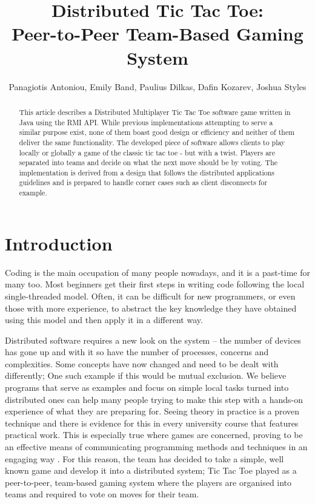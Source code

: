\documentclass[conference]{IEEEtran}
\begin{document}
\title{Distributed Tic Tac Toe:\\ Peer-to-Peer Team-Based Gaming System}

\author{Panagiotis Antoniou, Emily Band, Paulius Dilkas, Dafin Kozarev, Joshua Styles}
\maketitle

\begin{abstract}
This article describes a Distributed Multiplayer Tic Tac Toe software game written in Java using the RMI API. While previous implementations attempting to serve a similar purpose exist, none of them boast good design or efficiency and neither of them deliver the same functionality. The developed piece of software allows clients to play locally or globally a game of the classic tic tac toe - but with a twist. Players are separated into teams and decide on what the next move should be by voting. The implementation is derived from a design that follows the distributed applications guidelines and is prepared to handle corner cases such as client disconnects for example.
\end{abstract}

\section{Introduction}
Coding is the main occupation of many people nowadays, and it is a
past-time for many too. Most beginners get their first steps in writing code
following the local single-threaded model. Often, it can be difficult for
new programmers, or even those with more experience, to abstract the key
knowledge they have obtained using this model and then apply it in a different way.

Distributed software requires a new look on the system – the number of devices
has gone up and with it so have the number of processes, concerns and complexities.
Some concepts have now changed and need to be dealt with differently; One such
example if this would be mutual exclusion. We believe programs that serve as examples and
focus on simple local tasks turned into distributed ones can help many people
trying to make this step with a hands-on experience of what they are preparing
for. Seeing theory in practice is a proven technique and there is evidence for
this in every university course that features practical work. This is especially
true where games are concerned, proving to be an effective means of communicating 
programming methods and techniques in an engaging way
\cite{Kiniry:2011:VG:1984674.1984681}. For this reason, the team has decided to
take a simple, well known game and develop it into a distributed system; Tic Tac
Toe played as a peer-to-peer, team-based gaming system where the players are
organised into teams and required to vote on moves for their team.
\end{document}

